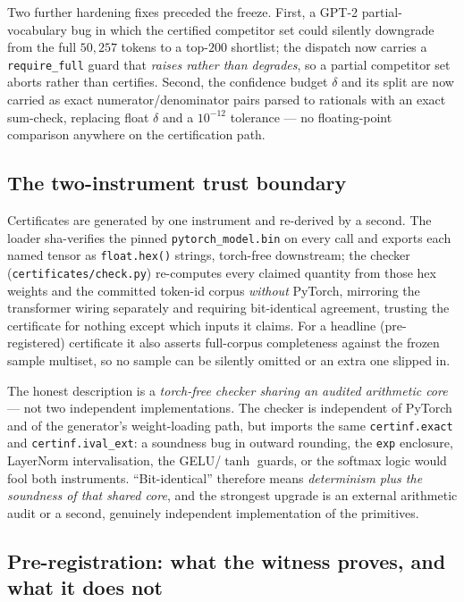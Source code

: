 \documentclass[11pt,a4paper]{article}
\begin{document}
Two further hardening fixes preceded the freeze. First, a GPT-2 partial-vocabulary bug in which the certified competitor set could silently downgrade from the full \(50{,}257\) tokens to a top-\(200\) shortlist; the dispatch now carries a \texttt{require\_full} guard that \emph{raises rather than degrades}, so a partial competitor set aborts rather than certifies. Second, the confidence budget \(\delta\) and its split are now carried as exact numerator/denominator pairs parsed to rationals with an exact sum-check, replacing float \(\delta\) and a \(10^{-12}\) tolerance --- no floating-point comparison anywhere on the certification path.

\subsection{The two-instrument trust boundary}

Certificates are generated by one instrument and re-derived by a second. The loader sha-verifies the pinned \texttt{pytorch\_model.bin} on every call and exports each named tensor as \texttt{float.hex()} strings, torch-free downstream; the checker (\texttt{certificates/check.py}) re-computes every claimed quantity from those hex weights and the committed token-id corpus \emph{without} PyTorch, mirroring the transformer wiring separately and requiring bit-identical agreement, trusting the certificate for nothing except which inputs it claims. For a headline (pre-registered) certificate it also asserts full-corpus completeness against the frozen sample multiset, so no sample can be silently omitted or an extra one slipped in.

The honest description is a \emph{torch-free checker sharing an audited arithmetic core} --- not two independent implementations. The checker is independent of PyTorch and of the generator's weight-loading path, but imports the same \texttt{certinf.exact} and \texttt{certinf.ival\_ext}: a soundness bug in outward rounding, the \texttt{exp} enclosure, LayerNorm intervalisation, the GELU/\(\tanh\) guards, or the softmax logic would fool both instruments. ``Bit-identical'' therefore means \emph{determinism plus the soundness of that shared core}, and the strongest upgrade is an external arithmetic audit or a second, genuinely independent implementation of the primitives.

\subsection{Pre-registration: what the witness proves, and what it does not}
\end{document}
